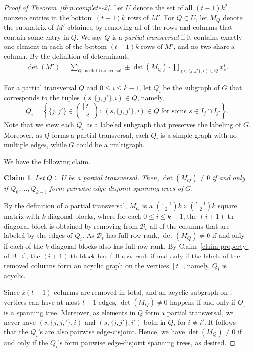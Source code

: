 \documentclass[11pt]{article}
\newtheorem{claim}[theorem]{Claim}
\newcommand\black[1]{{\color{black} #1}}
\begin{document}
\begin{proof}[Proof of Theorem~\ref{thm:complete-2}]
Let $U$ denote the set of all $(t-1)k^2$ nonzero entries in the bottom $(t-1)k$ rows of $M'$. For $Q\subset U$, let $M_Q$ denote the submatrix of $M'$ obtained by removing all of the rows and columns that contain some entry in $Q$. We say $Q$ is a \emph{partial transversal} if it contains exactly one element in each of the bottom $(t-1)k$ rows of $M'$, and no two share a column. By the definition of determinant,
\begin{align}\label{eq:new-2}
  \det(M') = \sum_{Q\text{ partial transversal}}^{} \pm \det(M_Q) \cdot \prod_{(s,\{j,j'\},i)\in Q}^{} x_s^i.
\end{align}

For a partial transversal $Q$ and $0\le i\le k-1$, let $Q_i$ be the subgraph of $G$ that corresponds to the tuples $(s,\{j,j'\},i)\in Q$, namely, $$Q_i=\left\{\{j,j'\}\in \binom{[t]}{2}:~\text{$(s,\{j,j'\},i)\in Q$ for some $s\in I_j\cap I_{j'}$}\right\}.$$ Note that we view each $Q_i$ as a labeled subgraph that preserves the labeling of $G$. Moreover, as $Q$ forms a partial transversal, each $Q_i$ is a simple graph with no multiple edges,  while $G$ could be a multigraph.

We have the following claim.

\begin{claim}\label{clm:new-2}
Let $Q\subseteq U$ be a partial transversal. Then, $\det(M_Q)\neq 0$ if and only if $Q_0,\ldots,Q_{k-1}$ form pairwise edge-disjoint spanning trees of $G$.
\end{claim}

\vspace{5pt}

 By the definition of a partial transversal, $M_Q$ is a $\binom{t-1}{2}k\times \binom{t-1}{2}k$ square matrix with $k$ diagonal blocks, where for each $0\le i\le k-1$, the $(i+1)$-th diagonal block is obtained by removing from $\mathcal{B}_t$ all of the columns that are labeled by the edges of $Q_i$. As $\mathcal{B}_t$ has full row rank, $\det(M_Q)\neq 0$ if and only if each of the $k$ diagonal blocks also has full row rank.
By Claim~\ref{claim-property-of-B_t}, the $(i+1)$-th block has full row rank if and only if the labels of the removed columns form an acyclic graph on the vertices $[t]$, namely, $Q_i$ is acyclic.

Since $k(t-1)$ columns are removed in total, and an acyclic subgraph on $t$ vertices can have at most $t-1$ edges,  $\det(M_Q)\neq 0$ \black{happens if and only if} $Q_i$ is a spanning tree. Moreover, as elements in $Q$ form a partial transversal, we never have $(s,\{j,j,'\},i)$ and $(s,\{j,j'\},i')$ both in $Q$, for $i\neq i'$. It follows that the $Q_i$'s are also pairwise edge-disjoint.
\black{Hence, we have $\det(M_Q)\neq 0$ if and only if the $Q_i$'s form pairwise edge-disjoint spanning trees, as desired.}


\end{proof}
\end{document}
